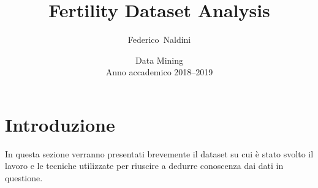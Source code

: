 \usepackage{multirow}           %

\onehalfspacing%

\setcounter{secnumdepth}{3}     %
\setcounter{tocdepth}{3}        %

\usepackage[%
  depth=3,            %
  open=false,         %
  numbered=true       %
]{bookmark}                     %
\usepackage{hyperref}           %
\usepackage[%
  english,italian,    %
  nameinlink          %
]{cleveref}                     %

\title{\LARGE{\textbf{Fertility Dataset Analysis}}}

\author{%
  Federico~Naldini
}

\date{%
  \small{Data Mining}\\%
  \small{Anno accademico 2018--2019}
}



  \maketitle
  \clearpage
  \tableofcontents
  \clearpage

  \section{Introduzione}
  In questa sezione verranno presentati brevemente il dataset su cui è stato svolto il lavoro e le tecniche utilizzate per riuscire a dedurre conoscenza dai dati in questione.
